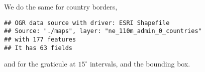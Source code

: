 \documentclass[paper=a4,10pt,div=17,headsepline,BCOR=12mm,twoside,open=right]{scrbook}\usepackage{knitr}
\begin{document}
We do the same for country borders,

\begin{knitrout}\footnotesize
{}\color{fgcolor}\begin{kframe}
\begin{alltt}
 \hlkwb{<-} \hlstd{(}\hlstd{,} \hlstd{=}\hlstd{)}
\end{alltt}
\begin{verbatim}
## OGR data source with driver: ESRI Shapefile 
## Source: "./maps", layer: "ne_110m_admin_0_countries"
## with 177 features
## It has 63 fields
\end{verbatim}
\begin{alltt}
 \hlkwb{<-} 
\end{alltt}


{\ttfamily\noindent\itshape\color{messagecolor}{\#\# Regions defined for each Polygons}}\begin{alltt}
 \hlkwb{<-}  \hlstd{(}\hlstd{))}
 \hlkwb{<-} 
\end{alltt}


{\ttfamily\noindent\itshape\color{messagecolor}{\#\# Regions defined for each Polygons}}\end{kframe}
\end{knitrout}

and for the graticule at $15^\circ$ intervals, and the bounding box.
\end{document}
